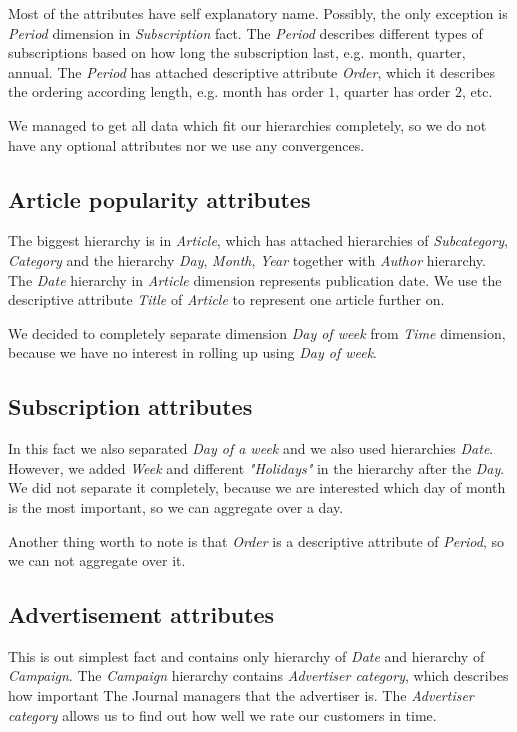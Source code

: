 
Most of the attributes have self explanatory name.
Possibly, the only exception is {\it Period} dimension in {\it Subscription} fact. The {\it Period} describes different types of subscriptions based on how long the subscription last, e.g. month, quarter, annual. The {\it Period} has attached descriptive attribute {\it Order}, which it describes the ordering according length, e.g. month has order $1$, quarter has order $2$, etc. 

We managed to get all data which fit our hierarchies completely, so we do not have any optional attributes nor we use any convergences. 

\subsection*{Article popularity attributes} 
The biggest hierarchy is in {\it Article}, which has attached hierarchies of {\it Subcategory}, {\it Category} and the hierarchy {\it Day}, {\it Month}, {\it Year} together with {\it Author} hierarchy. The {\it Date} hierarchy in {\it Article} dimension represents publication date. We use the descriptive attribute {\it Title} of {\it Article} to represent one article further on.

We decided to completely separate dimension {\it Day of week} from {\it Time} dimension, because we have no interest in rolling up using {\it Day of week}.

\subsection*{Subscription attributes}
In this fact we also separated {\it Day of a week} and we also used hierarchies {\it Date}. However, we added {\it Week} and different {\it "Holidays"} in the hierarchy after the {\it Day}. We did not separate it completely, because we are interested which day of month is the most important, so we can aggregate over a day.

Another thing worth to note is that {\it Order} is a descriptive attribute of {\it Period}, so we can not aggregate over it.

\subsection*{Advertisement attributes} 
This is out simplest fact and contains only hierarchy of {\it Date} and hierarchy of {\it Campaign}.
The {\it Campaign} hierarchy contains {\it Advertiser category}, which describes how important The Journal managers that the advertiser is. The {\it Advertiser category} allows us to find out how well we rate our customers in time.
